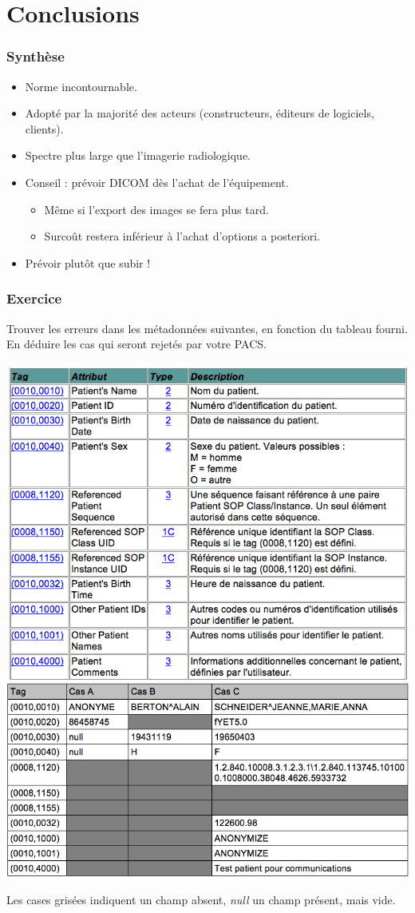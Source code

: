 \section{Conclusions}

\frame
{
	\frametitle{Synth\`ese}
	
	\begin{itemize}
		\item Norme incontournable.
		\item<2-> Adopt\'e par la majorit\'e des acteurs (constructeurs, \'editeurs de logiciels, clients).
		\item<3-> Spectre plus large que l'imagerie radiologique.
		\item<4-> Conseil : pr\'evoir DICOM d\`es l'achat de l'\'equipement.
		\begin{itemize}
			\item<5-> M\^eme si l'export des images se fera plus tard.
			\item<6-> Surco\^ut restera inf\'erieur \`a l'achat d'options a posteriori.
		\end{itemize}
		\item<7-> Pr\'evoir plut\^ot que subir !
	\end{itemize}
}

\frame
{
    \frametitle{Exercice}
    Trouver les erreurs dans les m\'etadonn\'ees suivantes, en fonction du tableau fourni.
    En d\'eduire les cas qui seront rejet\'es par votre PACS.

	\includegraphics[width=.45\linewidth]{./figures/table.png}
	\includegraphics[width=.45\linewidth]{./figures/metadata-cases.png}
    
    Les cases gris\'ees indiquent un champ absent, \emph{null} un champ pr\'esent, mais vide.
}

